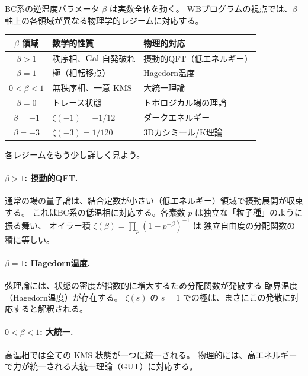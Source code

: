 BC系の逆温度パラメータ $\beta$ は実数全体を動く。
WBプログラムの視点では、$\beta$ 軸上の各領域が異なる物理学的レジームに対応する。

\begin{keybox}
\begin{center}
\renewcommand{\arraystretch}{1.3}
\begin{tabular}{c|l|l}
  \hline
  $\beta$ 領域 & 数学的性質 & 物理的対応 \\
  \hline
  $\beta > 1$ & 秩序相、$\operatorname{Gal}$ 自発破れ & 摂動的QFT（低エネルギー） \\
  $\beta = 1$ & 極（相転移点） & Hagedorn温度 \\
  $0 < \beta < 1$ & 無秩序相、一意 KMS & 大統一理論 \\
  $\beta = 0$ & トレース状態 & トポロジカル場の理論 \\
  $\beta = -1$ & $\zeta(-1) = -1/12$ & ダークエネルギー \\
  $\beta = -3$ & $\zeta(-3) = 1/120$ & 3Dカシミール/K理論 \\
  \hline
\end{tabular}
\end{center}
\end{keybox}

各レジームをもう少し詳しく見よう。

\paragraph{$\beta > 1$: 摂動的QFT.}
通常の場の量子論は、結合定数が小さい（低エネルギー）領域で摂動展開が収束する。
これはBC系の低温相に対応する。各素数 $p$ は独立な「粒子種」のように振る舞い、
オイラー積 $\zeta(\beta) = \prod_p(1-p^{-\beta})^{-1}$ は
独立自由度の分配関数の積に等しい。

\paragraph{$\beta = 1$: Hagedorn温度.}
弦理論には、状態の密度が指数的に増大するため分配関数が発散する
臨界温度（Hagedorn温度）が存在する。
$\zeta(s)$ の $s=1$ での極は、まさにこの発散に対応すると解釈される。

\paragraph{$0 < \beta < 1$: 大統一.}
高温相では全ての KMS 状態が一つに統一される。
物理的には、高エネルギーで力が統一される大統一理論（GUT）に対応する。

